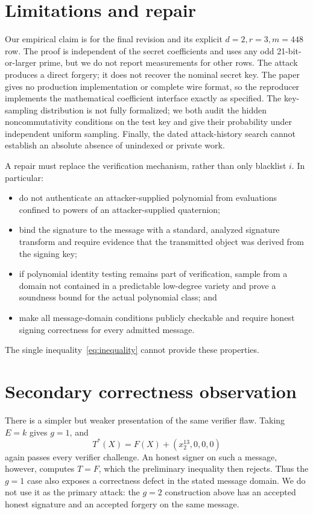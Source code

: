 \documentclass[10pt,a4paper]{article}
\begin{document}
\section{Limitations and repair}

Our empirical claim is for the final revision and its explicit
$d=2,r=3,m=448$ row.  The proof is independent of the secret coefficients and
uses any odd 21-bit-or-larger prime, but we do not report measurements for
other rows.  The attack produces a direct forgery; it does not recover the
nominal secret key.  The paper gives no production implementation or complete
wire format, so the reproducer implements the mathematical coefficient
interface exactly as specified.  The key-sampling distribution is not fully
formalized; we both audit the hidden noncommutativity conditions on the test
key and give their probability under independent uniform sampling.  Finally,
the dated attack-history search cannot establish an absolute absence of
unindexed or private work.

A repair must replace the verification mechanism, rather than only blacklist
$i$.  In particular:
\begin{itemize}
  \item do not authenticate an attacker-supplied polynomial from evaluations
  confined to powers of an attacker-supplied quaternion;
  \item bind the signature to the message with a standard, analyzed signature
  transform and require evidence that the transmitted object was derived from
  the signing key;
  \item if polynomial identity testing remains part of verification, sample
  from a domain not contained in a predictable low-degree variety and prove a
  soundness bound for the actual polynomial class; and
  \item make all message-domain conditions publicly checkable and require
  honest signing correctness for every admitted message.
\end{itemize}
The single inequality~\eqref{eq:inequality} cannot provide these properties.

\section{Secondary correctness observation}

There is a simpler but weaker presentation of the same verifier flaw.  Taking
$E=k$ gives $g=1$, and
\[
 T^*(X)=F(X)+(x_2^{13},0,0,0)
\]
again passes every verifier challenge.  An honest signer on such a message,
however, computes $T=F$, which the preliminary inequality then rejects.
Thus the $g=1$ case also exposes a correctness defect in the stated message
domain.  We do not use it as the primary attack: the $g=2$ construction above
has an accepted honest signature and an accepted forgery on the same message.
\end{document}
